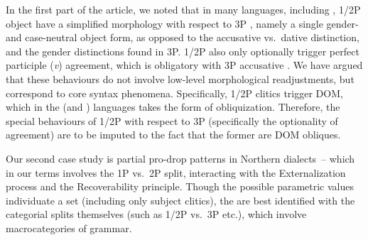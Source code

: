 \documentclass[output=paper]{langsci/langscibook}
\begin{document}
In the first part of the article, we noted that in many  languages,
including , 1/2P object  have a simplified morphology with
respect to 3P , namely a single gender- and case-neutral object form, as
opposed to the accusative vs.\ dative distinction, and the gender distinctions
found in 3P. 1/2P  also only optionally trigger perfect participle
(\emph{v}) agreement, which is obligatory with 3P accusative . We have
argued that these behaviours do not involve low-level morphological
readjustments, but correspond to core syntax phenomena.  Specifically, 1/2P
clitics trigger DOM, which in the  (and ) languages takes
the form of obliquization. Therefore, the special behaviours of 1/2P 
with respect to 3P  (specifically the optionality of agreement) are to
be imputed to the fact that the former are DOM obliques.

Our second case study is partial pro-drop patterns in Northern  dialects~–
which in our terms involves the 1P vs.\ 2P split, interacting with the
Externalization process and the Recoverability principle. Though the possible
parametric values individuate a  set (including only subject
clitics), the  are best identified with the categorial splits
themselves (such as 1/2P vs.\ 3P etc.), which involve macrocategories of
grammar.

\pagebreak\printchapterglossary

{\sloppy\printbibliography[heading=subbibliography,notkeyword=this]}
\end{document}
